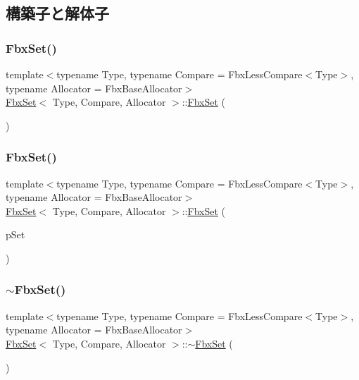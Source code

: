 \subsection{構築子と解体子}
\mbox{\label{class_fbx_set_ae540e486ff517af7f865c8a1c499df79}} 
\subsubsection{\texorpdfstring{Fbx\+Set()}{FbxSet()}\hspace{0.1cm}{\footnotesize\ttfamily [1/2]}}
{\footnotesize\ttfamily template$<$typename Type, typename Compare = Fbx\+Less\+Compare$<$\+Type$>$, typename Allocator = Fbx\+Base\+Allocator$>$ \\
\hyperlink{class_fbx_set}{Fbx\+Set}$<$ Type, Compare, Allocator $>$\+::\hyperlink{class_fbx_set}{Fbx\+Set} (\begin{DoxyParamCaption}{ }\end{DoxyParamCaption})}

\mbox{\label{class_fbx_set_a83bf0b02ec208241ffbc725db1d9c70d}} 
\subsubsection{\texorpdfstring{Fbx\+Set()}{FbxSet()}\hspace{0.1cm}{\footnotesize\ttfamily [2/2]}}
{\footnotesize\ttfamily template$<$typename Type, typename Compare = Fbx\+Less\+Compare$<$\+Type$>$, typename Allocator = Fbx\+Base\+Allocator$>$ \\
\hyperlink{class_fbx_set}{Fbx\+Set}$<$ Type, Compare, Allocator $>$\+::\hyperlink{class_fbx_set}{Fbx\+Set} (\begin{DoxyParamCaption}\item[{const \hyperlink{class_fbx_set}{Fbx\+Set}$<$ Type, Compare, Allocator $>$ \&}]{p\+Set }\end{DoxyParamCaption})}

\mbox{\label{class_fbx_set_ace2b54de05237b1ad7223cb51a8f319a}} 
\subsubsection{\texorpdfstring{$\sim$\+Fbx\+Set()}{~FbxSet()}}
{\footnotesize\ttfamily template$<$typename Type, typename Compare = Fbx\+Less\+Compare$<$\+Type$>$, typename Allocator = Fbx\+Base\+Allocator$>$ \\
\hyperlink{class_fbx_set}{Fbx\+Set}$<$ Type, Compare, Allocator $>$\+::$\sim$\hyperlink{class_fbx_set}{Fbx\+Set} (\begin{DoxyParamCaption}{ }\end{DoxyParamCaption})}



